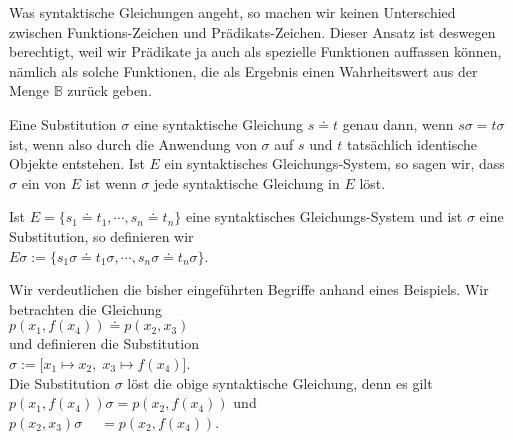 Was syntaktische Gleichungen angeht, so machen wir keinen Unterschied zwischen Funktions-Zeichen und
Prädikats-Zeichen.   Dieser Ansatz ist deswegen berechtigt, weil wir Prädikate
ja auch als spezielle Funktionen auffassen können, nämlich als solche
Funktionen, die als Ergebnis einen Wahrheitswert aus der Menge  $\mathbb{B}$ zurück geben.

\begin{Definition}[Unifikator]
Eine Substitution $\sigma$  eine syntaktische Gleichung $s \doteq t$ genau dann, wenn
$s\sigma = t\sigma$ ist, wenn also durch die Anwendung von $\sigma$ auf $s$ und $t$
tatsächlich identische Objekte entstehen.  Ist $E$ ein syntaktisches Gleichungs-System, so 
sagen wir, dass $\sigma$ ein  von $E$ ist wenn $\sigma$ jede
syntaktische Gleichung in $E$ löst. 
\eox
\end{Definition}
Ist $E = \{ s_1 \doteq t_1, \cdots, s_n \doteq t_n \}$ eine syntaktisches Gleichungs-System
und ist $\sigma$ eine Substitution, so definieren wir \\[0.2cm]
\hspace*{1.3cm}  $E\sigma := \{ s_1\sigma \doteq t_1\sigma, \cdots, s_n\sigma \doteq t_n\sigma \}$.
\vspace{0.3cm}

\example
Wir verdeutlichen die bisher eingeführten Begriffe anhand eines Beispiels.  
Wir betrachten die Gleichung \\[0.2cm]
\hspace*{1.3cm} $p(x_1, f(x_4)) \doteq p( x_2, x_3)$ \\[0.2cm]
und definieren die Substitution \\[0.2cm]
\hspace*{1.3cm} $\sigma := \big[ x_1 \mapsto x_2,\; x_3 \mapsto f(x_4) \big]$. \\[0.2cm]
Die Substitution $\sigma$ löst die obige syntaktische Gleichung, denn es gilt \\[0.2cm]
\hspace*{1.3cm} $p(x_1, f(x_4))\sigma = p(x_2, f(x_4))$ \quad und \quad \\[0.2cm]
\hspace*{1.3cm} $p(x_2, x_3)\sigma \;\quad = p(x_2, f(x_4))$.  \eox


